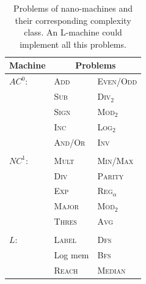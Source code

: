 \documentclass[10pt,sigconf]{acmart}
\begin{document}
\begin{table}[h!]
  \caption{Problems of nano-machines and their corresponding complexity class. An L-machine could implement all this problems.}
  \begin{tabular}{ p{1.5cm} p{2cm} p{2cm}}
    \hline
    Machine & \multicolumn{2}{c}{Problems} \\
    \hline
    $AC^0$: & \textsc{Add} & \textsc{Even}/\textsc{Odd}  \\
            & \textsc{Sub} & \textsc{Div$_{2}$}  \\
            & \textsc{Sign} & \textsc{Mod$_{2}$}  \\
            & \textsc{Inc} & \textsc{Log$_{2}$}  \\
            & \textsc{And}/\textsc{Or} & \textsc{Inv}  \\
            &  &   \\
    $NC^1$:   & \textsc{Mult} &\textsc{Min}/\textsc{Max}    \\
             & \textsc{Div} & \textsc{Parity}  \\
             & \textsc{Exp} & \textsc{Reg$_{\alpha}$}  \\
             & \textsc{Major} & \textsc{Mod$_{2}$}  \\
             & \textsc{Thres} & \textsc{Avg}  \\
             &  &   \\
    $L$:      &   \textsc{Label} & \textsc{Dfs}      \\
             & Log mem & \textsc{Bfs}  \\
             & \textsc{Reach}  & \textsc{Median}  \\
            
    \hline 
  \end{tabular}\\
    
 
  \label{table1}
\end{table}
\end{document}
